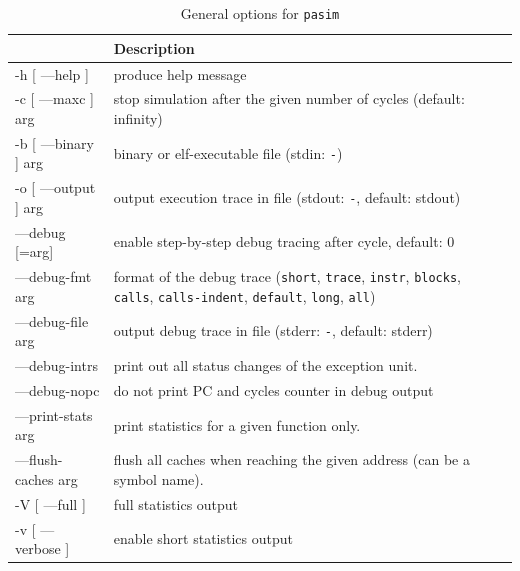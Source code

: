 \documentclass[a4paper,fontsize=10pt,twoside,DIV15,BCOR12mm,headinclude=true,footinclude=false,pagesize,bibtotoc]{scrbook}
\begin{document}
\begin{table}[b!]
  \centering
  \caption{General options for \texttt{pasim}}
  \label{tab:pasimopts_gen}
  \begin{tabular}{>{\ttfamily}l<{}p{}}
    \toprule
    \multicolumn{1}{l}{Option} & Description \\
    \midrule
    -h [ ---help ]       & produce help message \\
    -c [ ---maxc ] arg   & stop simulation after the given number of cycles (default: infinity) \\
    -b [ ---binary ] arg & binary or elf-executable file (stdin: \texttt{-}) \\
    -o [ ---output ] arg & output execution trace in file (stdout: \texttt{-}, default: stdout) \\
    ---debug [=arg]      & enable step-by-step debug tracing after cycle, default: 0 \\
    ---debug-fmt arg     & format of the debug trace (\texttt{short}, \texttt{trace}, \texttt{instr}, \texttt{blocks}, \texttt{calls}, \texttt{calls-indent}, \texttt{default}, \texttt{long}, \texttt{all}) \\
    ---debug-file arg    & output debug trace in file (stderr: \texttt{-}, default: stderr) \\
    ---debug-intrs       & print out all status changes of the exception unit. \\
    ---debug-nopc        & do not print PC and cycles counter in debug output \\
    ---print-stats arg   & print statistics for a given function only. \\
    ---flush-caches arg  & flush all caches when reaching the given address (can be a symbol name). \\
    -V [ ---full ]       & full statistics output \\
    -v [ ---verbose ]    & enable short statistics output \\
    \bottomrule
  \end{tabular}
\end{table}
\end{document}
